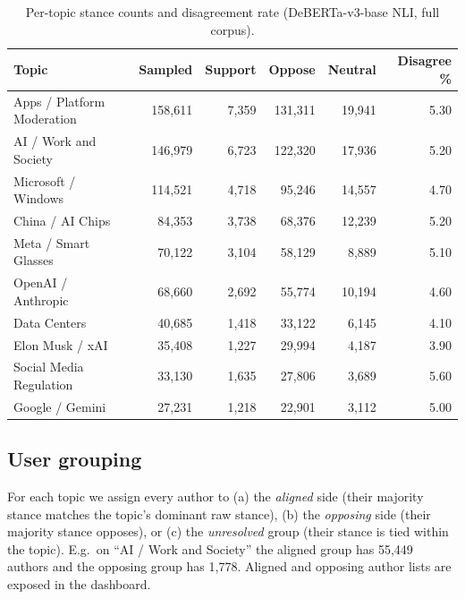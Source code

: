 \documentclass[11pt,a4paper]{article}
\begin{document}
\begin{table}[H]
\centering
\small
\caption{Per-topic stance counts and disagreement rate (DeBERTa-v3-base NLI, full corpus).}
\label{tab:stance}
\renewcommand{\arraystretch}{1.15}
\begin{tabular}{l r r r r r}
\toprule
\textbf{Topic} & \textbf{Sampled} & \textbf{Support} & \textbf{Oppose} & \textbf{Neutral} & \textbf{Disagree \%} \\
\midrule
Apps / Platform Moderation & 158{,}611 & 7{,}359 & 131{,}311 & 19{,}941 & 5.30 \\
AI / Work and Society      & 146{,}979 & 6{,}723 & 122{,}320 & 17{,}936 & 5.20 \\
Microsoft / Windows        & 114{,}521 & 4{,}718 &  95{,}246 & 14{,}557 & 4.70 \\
China / AI Chips           &  84{,}353 & 3{,}738 &  68{,}376 & 12{,}239 & 5.20 \\
Meta / Smart Glasses       &  70{,}122 & 3{,}104 &  58{,}129 &  8{,}889 & 5.10 \\
OpenAI / Anthropic         &  68{,}660 & 2{,}692 &  55{,}774 & 10{,}194 & 4.60 \\
Data Centers               &  40{,}685 & 1{,}418 &  33{,}122 &  6{,}145 & 4.10 \\
Elon Musk / xAI            &  35{,}408 & 1{,}227 &  29{,}994 &  4{,}187 & 3.90 \\
Social Media Regulation    &  33{,}130 & 1{,}635 &  27{,}806 &  3{,}689 & 5.60 \\
Google / Gemini            &  27{,}231 & 1{,}218 &  22{,}901 &  3{,}112 & 5.00 \\
\bottomrule
\end{tabular}
\end{table}

\subsection{User grouping}
For each topic we assign every author to (a) the \emph{aligned} side (their majority stance matches
the topic's dominant raw stance), (b) the \emph{opposing} side (their majority stance opposes), or
(c) the \emph{unresolved} group (their stance is tied within the topic). E.g.\ on
``AI / Work and Society'' the aligned group has 55{,}449 authors and the opposing group has
1{,}778. Aligned and opposing author lists are exposed in the dashboard.
\end{document}
